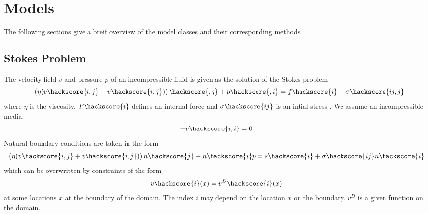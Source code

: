
%
%
%


\chapter{Models}
\label{MODELS CHAPTER}

The following sections give a breif overview of the model classes and their corresponding methods.

\section{Stokes Problem}
The velocity  field $v$ and pressure $p$ of an incompressible fluid  is given as the solution of the Stokes problem
\begin{equation}\label{Stokes 1}
-\left(\eta(v\hackscore{i,j}+ v\hackscore{i,j})\right)\hackscore{,j}+p\hackscore{,i}=f\hackscore{i}-\sigma\hackscore{ij,j}
\end{equation}
where $\eta$ is the viscosity, $F\hackscore{i}$ defines an internal force  and $\sigma\hackscore{ij}$ is an intial stress . We assume an incompressible media:
\begin{equation}\label{Stokes 2}
-v\hackscore{i,i}=0
\end{equation}
Natural boundary conditions are taken in the form 
\begin{equation}\label{Stokes Boundary}
\left(\eta(v\hackscore{i,j}+ v\hackscore{i,j})\right)n\hackscore{j}-n\hackscore{i}p=s\hackscore{i}+\sigma\hackscore{ij} n\hackscore{i}
\end{equation}
which can be overwritten by constraints of the form 
\begin{equation}\label{Stokes Boundary0}
v\hackscore{i}(x)=v^D\hackscore{i}(x)
\end{equation}
at some locations $x$ at the boundary of the domain. The index $i$ may depend on the location $x$ on the boundary.
$v^D$ is a given function on the domain.

